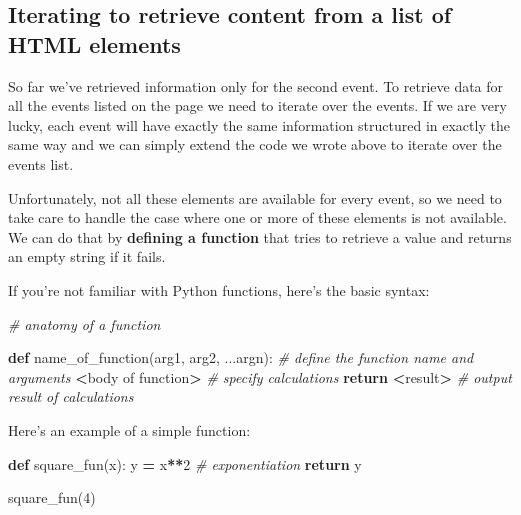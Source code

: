 \documentclass[
]{book}
\newenvironment{Shaded}{\begin{snugshade}}{\end{snugshade}}
\newcommand{\CommentTok}[1]{\textcolor[rgb]{0.56,0.35,0.01}{\textit{#1}}}
\newcommand{\ControlFlowTok}[1]{\textcolor[rgb]{0.13,0.29,0.53}{\textbf{#1}}}
\newcommand{\DecValTok}[1]{\textcolor[rgb]{0.00,0.00,0.81}{#1}}
\newcommand{\KeywordTok}[1]{\textcolor[rgb]{0.13,0.29,0.53}{\textbf{#1}}}
\newcommand{\NormalTok}[1]{#1}
\newcommand{\OperatorTok}[1]{\textcolor[rgb]{0.81,0.36,0.00}{\textbf{#1}}}
\begin{document}
\hypertarget{iterating-to-retrieve-content-from-a-list-of-html-elements}{%
\subsection{Iterating to retrieve content from a list of HTML elements}\label{iterating-to-retrieve-content-from-a-list-of-html-elements}}

So far we've retrieved information only for the second event. To
retrieve data for all the events listed on the page we need to iterate
over the events. If we are very lucky, each event will have exactly
the same information structured in exactly the same way and we can
simply extend the code we wrote above to iterate over the events list.

Unfortunately, not all these elements are available for every event, so
we need to take care to handle the case where one or more of these
elements is not available. We can do that by \textbf{defining a function} that
tries to retrieve a value and returns an empty string if it fails.

If you're not familiar with Python functions, here's the basic syntax:

\begin{Shaded}
\begin{Highlighting}[]
\CommentTok{\# anatomy of a function}

\KeywordTok{def}\NormalTok{ name\_of\_function(arg1, arg2, ...argn):  }\CommentTok{\# define the function name and arguments}
    \OperatorTok{\textless{}}\NormalTok{body of function}\OperatorTok{\textgreater{}}   \CommentTok{\# specify calculations}
    \ControlFlowTok{return} \OperatorTok{\textless{}}\NormalTok{result}\OperatorTok{\textgreater{}}      \CommentTok{\# output result of calculations}
\end{Highlighting}
\end{Shaded}

Here's an example of a simple function:

\begin{Shaded}
\begin{Highlighting}[]
\KeywordTok{def}\NormalTok{ square\_fun(x):}
\NormalTok{    y }\OperatorTok{=}\NormalTok{ x}\OperatorTok{**}\DecValTok{2} \CommentTok{\# exponentiation}
    \ControlFlowTok{return}\NormalTok{ y}

\NormalTok{square\_fun(}\DecValTok{4}\NormalTok{)    }
\end{Highlighting}
\end{Shaded}
\end{document}

